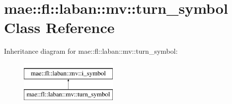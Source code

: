 \hypertarget{classmae_1_1fl_1_1laban_1_1mv_1_1turn__symbol}{\section{mae\-:\-:fl\-:\-:laban\-:\-:mv\-:\-:turn\-\_\-symbol Class Reference}
\label{classmae_1_1fl_1_1laban_1_1mv_1_1turn__symbol}
}
Inheritance diagram for mae\-:\-:fl\-:\-:laban\-:\-:mv\-:\-:turn\-\_\-symbol\-:\begin{figure}[H]
\begin{center}
\leavevmode
\includegraphics[height=2.000000cm]{classmae_1_1fl_1_1laban_1_1mv_1_1turn__symbol}
\end{center}
\end{figure}

